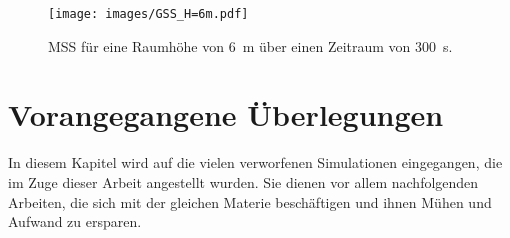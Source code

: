 \begin{figure}
    \centering
    \texttt{[image: images/GSS\_H=6m.pdf]}
    \caption{MSS für eine Raumhöhe von 6~m über einen Zeitraum von 300~s.}
    \label{fig:GSS_H=6m}
\end{figure}

\section{Vorangegangene Überlegungen}
\label{sec:vorangegangeneSimulationen}
In diesem Kapitel wird auf die vielen verworfenen Simulationen eingegangen, die im Zuge dieser Arbeit angestellt wurden. Sie dienen vor allem nachfolgenden Arbeiten, die sich mit der gleichen Materie beschäftigen und ihnen Mühen und Aufwand zu ersparen.

